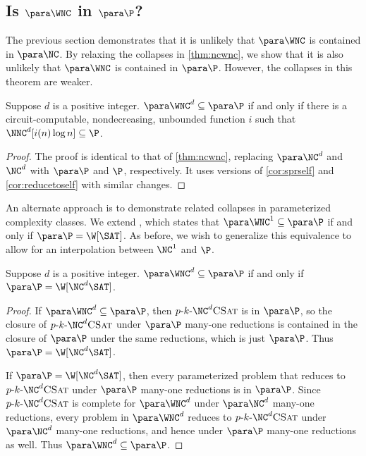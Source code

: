 \subsection{Is \texorpdfstring{$\para \WNC$}{paraWNC} in \texorpdfstring{$\para \P$}{paraP}?}
\label{sec:wncp}

The previous section demonstrates that it is unlikely that $\para \WNC$ is contained in $\para \NC$.
By relaxing the collapses in \autoref{thm:ncwnc}, we show that it is also unlikely that $\para \WNC$ is contained in $\para \P$.
However, the collapses in this theorem are weaker.

\begin{theorem}\label{thm:wncp}
  Suppose $d$ is a positive integer.
  $\para \WNC^d \subseteq \para \P$ if and only if there is a circuit-computable, nondecreasing, unbounded function $i$ such that $\NNC^d[i(n) \log n] \subseteq \P$.
\end{theorem}
\begin{proof}
  The proof is identical to that of \autoref{thm:ncwnc}, replacing $\para \NC^d$ and $\NC^d$ with $\para \P$ and $\P$, respectively.
  It uses versions of \autoref{cor:sprself} and \autoref{cor:reducetoself} with similar changes.
\end{proof}

An alternate approach is to demonstrate related collapses in parameterized complexity classes.
We extend \autocite[Corollary~3.8]{est15}, which states that $\para \WNC^1 \subseteq \para \P$ if and only if $\para \P = \W[\SAT]$.
As before, we wish to generalize this equivalence to allow for an interpolation between $\NC^1$ and $\P$.

\begin{theorem}
  Suppose $d$ is a positive integer.
  $\para \WNC^d \subseteq \para \P$ if and only if $\para \P = \W[\NC^d \SAT]$.
\end{theorem}
\begin{proof}
  If $\para \WNC^d \subseteq \para \P$, then $\pNCSAT$ is in $\para \P$, so the closure of $\pNCSAT$ under $\para \P$ many-one reductions is contained in the closure of $\para \P$ under the same reductions, which is just $\para \P$.
  Thus $\para \P = \W[\NC^d \SAT]$.

  If $\para \P = \W[\NC^d \SAT]$, then every parameterized problem that reduces to $\pNCSAT$ under $\para \P$ many-one reductions is in $\para \P$.
  Since $\pNCSAT$ is complete for $\para \WNC^d$ under $\para \NC^d$ many-one reductions, every problem in $\para \WNC^d$ reduces to $\pNCSAT$ under $\para \NC^d$ many-one reductions, and hence under $\para \P$ many-one reductions as well.
  Thus $\para \WNC^d \subseteq \para \P$.
\end{proof}

